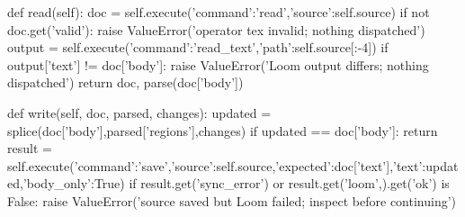     def read(self):
        doc = self.execute({'command':'read','source':self.source})
        if not doc.get('valid'): raise ValueError('operator tex invalid; nothing dispatched')
        output = self.execute({'command':'read_text','path':self.source[:-4]})
        if output['text'] != doc['body']: raise ValueError('Loom output differs; nothing dispatched')
        return doc, parse(doc['body'])

    def write(self, doc, parsed, changes):
        updated = splice(doc['body'],parsed['regions'],changes)
        if updated == doc['body']: return
        result = self.execute({'command':'save','source':self.source,'expected':doc['text'],'text':updated,'body_only':True})
        if result.get('sync_error') or result.get('loom',{}).get('ok') is False:
            raise ValueError('source saved but Loom failed; inspect before continuing')

